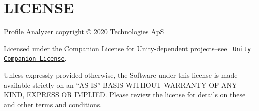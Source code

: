 \chapter{LICENSE}
\hypertarget{md__library_2_package_cache_2com_8unity_8performance_8profile-analyzer_0d1_82_82_2_l_i_c_e_n_s_e}{}\label{md__library_2_package_cache_2com_8unity_8performance_8profile-analyzer_0d1_82_82_2_l_i_c_e_n_s_e}
Profile Analyzer copyright © 2020  Technologies ApS

Licensed under the  Companion License for Unity-\/dependent projects--see \href{http://www.unity3d.com/legal/licenses/Unity_Companion_License}{\texttt{ Unity Companion License}}.

Unless expressly provided otherwise, the Software under this license is made available strictly on an “\+AS IS” BASIS WITHOUT WARRANTY OF ANY KIND, EXPRESS OR IMPLIED. Please review the license for details on these and other terms and conditions. 